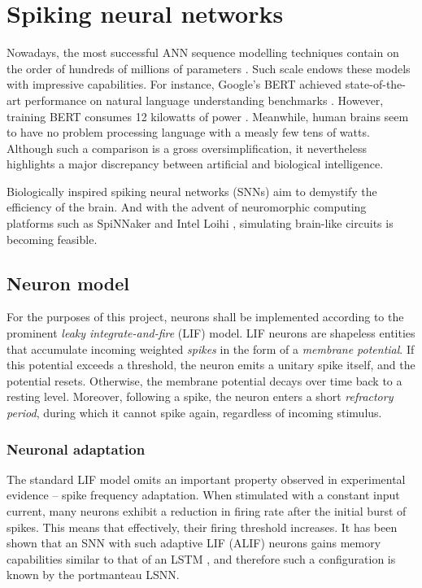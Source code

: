 \documentclass[../../report.tex]{subfiles}
\begin{document}
\section{Spiking neural networks}

Nowadays, the most successful ANN sequence modelling techniques contain on the
order of hundreds of millions of parameters \cite{Bender2021}. Such scale endows
these models with impressive capabilities. For instance, Google's BERT achieved
state-of-the-art performance on natural language understanding benchmarks
\cite{Devlin2019}. However, training BERT consumes 12 kilowatts of power
\cite{Strubell2019}. Meanwhile, human brains seem to have no problem processing
language with a measly few tens of watts. Although such a comparison is a gross
oversimplification, it nevertheless highlights a major discrepancy between
artificial and biological intelligence.

Biologically inspired spiking neural networks (SNNs) aim to demystify the
efficiency of the brain. And with the advent of neuromorphic computing platforms
such as SpiNNaker \cite{Furber2014} and Intel Loihi \cite{Davies2018},
simulating brain-like circuits is becoming feasible.

\subsection{Neuron model}

For the purposes of this project, neurons shall be implemented according to the
prominent \emph{leaky integrate-and-fire} (LIF) model. LIF neurons are shapeless
entities that accumulate incoming weighted \emph{spikes} in the form of a
\emph{membrane potential}. If this potential exceeds a threshold, the neuron
emits a unitary spike itself, and the potential resets. Otherwise, the membrane
potential decays over time back to a resting level. Moreover, following a spike,
the neuron enters a short \emph{refractory period}, during which it cannot spike
again, regardless of incoming stimulus.


\subsubsection{Neuronal adaptation}
The standard LIF model omits an important property observed in experimental
evidence -- spike frequency adaptation. When stimulated with a constant input
current, many neurons exhibit a reduction in firing rate after the initial burst
of spikes. This means that effectively, their firing threshold increases. It has
been shown that an SNN with such adaptive LIF (ALIF) neurons gains memory
capabilities similar to that of an LSTM \cite{Bellec2018LSNN}, and therefore
such a configuration is known by the portmanteau LSNN.
\end{document}
